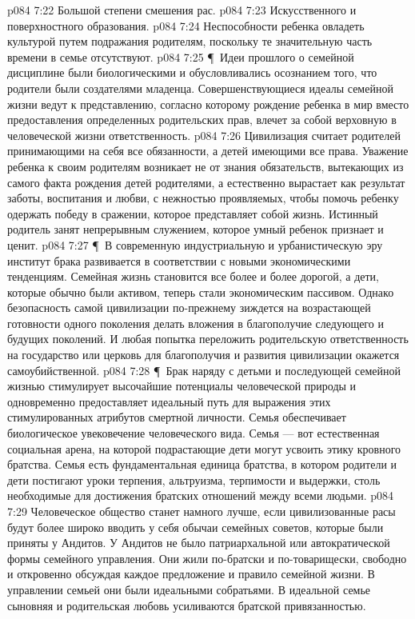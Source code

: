 \vs p084 7:22 \bibnobreakspace Большой степени смешения рас.
\vs p084 7:23 \bibnobreakspace Искусственного и поверхностного образования.
\vs p084 7:24 \bibnobreakspace Неспособности ребенка овладеть культурой путем подражания родителям, поскольку те значительную часть времени в семье отсутствуют.
\vs p084 7:25 \P\ Идеи прошлого о семейной дисциплине были биологическими и обусловливались осознанием того, что родители были создателями младенца. Совершенствующиеся идеалы семейной жизни ведут к представлению, согласно которому рождение ребенка в мир вместо предоставления определенных родительских прав, влечет за собой верховную в человеческой жизни ответственность.
\vs p084 7:26 Цивилизация считает родителей принимающими на себя все обязанности, а детей имеющими все права. Уважение ребенка к своим родителям возникает не от знания обязательств, вытекающих из самого факта рождения детей родителями, а естественно вырастает как результат заботы, воспитания и любви, с нежностью проявляемых, чтобы помочь ребенку одержать победу в сражении, которое представляет собой жизнь. Истинный родитель занят непрерывным служением, которое умный ребенок признает и ценит.
\vs p084 7:27 \P\ В современную индустриальную и урбанистическую эру институт брака развивается в соответствии с новыми экономическими тенденциям. Семейная жизнь становится все более и более дорогой, а дети, которые обычно были активом, теперь стали экономическим пассивом. Однако безопасность самой цивилизации по\hyp{}прежнему зиждется на возрастающей готовности одного поколения делать вложения в благополучие следующего и будущих поколений. И любая попытка переложить родительскую ответственность на государство или церковь для благополучия и развития цивилизации окажется самоубийственной.
\vs p084 7:28 \P\ Брак наряду с детьми и последующей семейной жизнью стимулирует высочайшие потенциалы человеческой природы и одновременно предоставляет идеальный путь для выражения этих стимулированных атрибутов смертной личности. Семья обеспечивает биологическое увековечение человеческого вида. Семья --- вот естественная социальная арена, на которой подрастающие дети могут усвоить этику кровного братства. Семья есть фундаментальная единица братства, в котором родители и дети постигают уроки терпения, альтруизма, терпимости и выдержки, столь необходимые для достижения братских отношений между всеми людьми.
\vs p084 7:29 Человеческое общество станет намного лучше, если цивилизованные расы будут более широко вводить у себя обычаи семейных советов, которые были приняты у Андитов. У Андитов не было патриархальной или автократической формы семейного управления. Они жили по\hyp{}братски и по\hyp{}товарищески, свободно и откровенно обсуждая каждое предложение и правило семейной жизни. В управлении семьей они были идеальными собратьями. В идеальной семье сыновняя и родительская любовь усиливаются братской привязанностью.
